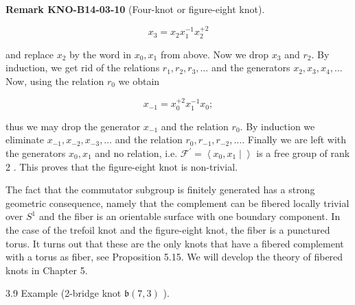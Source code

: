 \documentclass[10pt, letterpaper]{article}
\newcommand{\CustomHeading}[3]{%
  \par\medskip\noindent%
  \textbf{#1 #2} \textnormal{(#3)}.\enskip%
}
\newenvironment{REM}[2]{\begin{unitbox}\CustomHeading{Remark}{#1}{#2}}{\end{unitbox}}
\begin{document}
\begin{REM}{KNO-B14-03-10}{Four-knot or figure-eight knot}
$$
x_{3}=x_{2} x_{1}^{-1} x_{2}^{+2}
$$

and replace $x_{2}$ by the word in $x_{0}, x_{1}$ from above. Now we drop $x_{3}$ and $r_{2}$. By induction, we get rid of the relations $r_{1}, r_{2}, r_{3}, \ldots$ and the generators $x_{2}, x_{3}, x_{4}, \ldots$ Now, using the relation $r_{0}$ we obtain

$$
x_{-1}=x_{0}^{+2} x_{1}^{-1} x_{0} ;
$$

thus we may drop the generator $x_{-1}$ and the relation $r_{0}$. By induction we eliminate $x_{-1}, x_{-2}, x_{-3}, \ldots$ and the relation $r_{0}, r_{-1}, r_{-2}, \ldots$. Finally we are left with the generators $x_{0}, x_{1}$ and no relation, i.e. $\mathcal{F}^{\prime}=\left\langle x_{0}, x_{1} \mid\right\rangle$ is a free group of rank 2 . This proves that the figure-eight knot is non-trivial.
\end{REM}




The fact that the commutator subgroup is finitely generated has a strong geometric consequence, namely that the complement can be fibered locally trivial over $S^{1}$ and the fiber is an orientable surface with one boundary component. In the case of the trefoil knot and the figure-eight knot, the fiber is a punctured torus. It turns out that these are the only knots that have a fibered complement with a torus as fiber, see Proposition 5.15. We will develop the theory of fibered knots in Chapter 5.



3.9 Example (2-bridge knot $\mathfrak{b}(7,3)$ ). 
\end{document}

